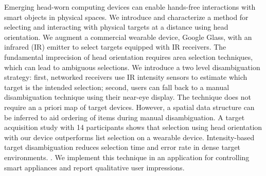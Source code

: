 Emerging head-worn computing devices can enable hands-free interactions with smart objects in physical spaces. 
%
We introduce and characterize a method for selecting and interacting with physical targets at a distance using head orientation. We augment a commercial wearable device, Google Glass, with an infrared (IR) emitter to select targets equipped with IR receivers. The fundamental imprecision of head orientation requires area selection techniques, which can lead to ambiguous selections. We introduce a two level disambiguation strategy: first, networked receivers use IR intensity sensors to estimate which target is the intended selection; second, users can fall back to a manual disambiguation technique using their near-eye display. The technique does not require an a priori map of target devices. However, a spatial data structure can be inferred to aid ordering of items during manual disambiguation.
%
A target acquisition study with 14 participants shows that selection using head orientation with our device outperforms list selection on a wearable device. Intensity-based target disambiguation reduces selection time and error rate in dense target environments. . We implement this technique in an application for controlling smart appliances and report qualitative user impressions.